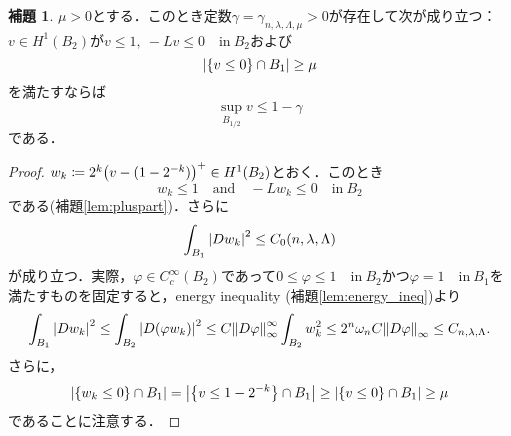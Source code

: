 \documentclass[a4paper]{ltjsarticle}
\newcommand{\inn}{\quad\text{in}\ }
\newcommand{\1}{\mathbbm{1}}
\numberwithin{equation}{section}
\theoremstyle{definition}
\newtheorem{lem}[thm]{補題}
\begin{document}
\begin{lem}\label{lem:DG_N_oscillation}
    $\mu>0$とする．このとき定数$\gamma=\gamma_{n,\lambda,\Lambda,\mu}>0$が存在して次が成り立つ：$v\in H^1(B_2)$が$v\leq 1,\ -Lv\leq0\inn B_2$および
    \begin{equation}
        \abs{\qty{v\leq0}\cap B_1}\geq \mu
    \end{equation}
    を満たすならば
    \begin{equation}
        \sup_{B_{1/2}}v\leq 1-\gamma 
    \end{equation}
    である．
\end{lem}
\begin{proof}
    $w_k\coloneqq 2^k\qty(v-(1-2^{-k}))^+\in H^{1}(B_2)$とおく．このとき
    \begin{equation}
        w_k\leq 1\quad \text{and}\quad -Lw_k\leq0\inn B_2 
    \end{equation}
    である(補題\ref{lem:pluspart})．さらに
    \begin{equation}
        \int_{B_1}\abs{Dw_k}^2\leq C_0(n,\lambda,\Lambda)
    \end{equation}
    が成り立つ．実際，$\varphi\in C^{\infty}_{c}(B_2)$であって$0\leq\varphi\leq 1\inn B_2$かつ$\varphi=1\inn B_1$を満たすものを固定すると，energy inequality (補題\ref{lem:energy_ineq})より
    \begin{equation}
        \int_{B_1}\abs{Dw_{k}}^2\leq \int_{B_2}\abs{D(\varphi w_k)}^2\leq C \norm{D\varphi}_{\infty}^{\infty}\int_{B_2}w_k^2\leq 2^n\omega_nC\norm{D\varphi}_{\infty}\leq C_{n,\lambda,\Lambda}.
    \end{equation}
    さらに，
    \begin{equation}
        \abs{\qty{w_k\leq0}\cap B_1}=\abs{\qty{v\leq 1-2^{-k}}\cap B_1}\geq \abs{\qty{v\leq 0}\cap B_1}\geq\mu 
    \end{equation}
    であることに注意する．


\end{proof}
\end{document}
